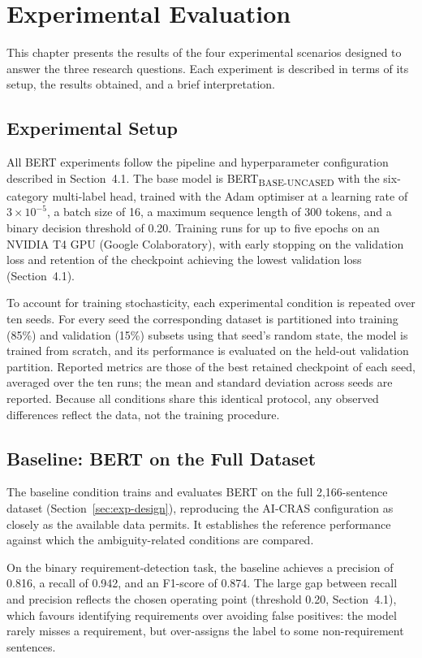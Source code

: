 \chapter{Experimental Evaluation}

This chapter presents the results of the four experimental scenarios designed to answer the three research questions. Each experiment is described in terms of its setup, the results obtained, and a brief interpretation.

\section{Experimental Setup}

All BERT experiments follow the pipeline and hyperparameter configuration described in Section~4.1. The base model is BERT\textsubscript{BASE-UNCASED} with the six-category multi-label head, trained with the Adam optimiser at a learning rate of $3\times10^{-5}$, a batch size of 16, a maximum sequence length of 300 tokens, and a binary decision threshold of 0.20. Training runs for up to five epochs on an NVIDIA T4 GPU (Google Colaboratory), with early stopping on the validation loss and retention of the checkpoint achieving the lowest validation loss (Section~4.1).

To account for training stochasticity, each experimental condition is repeated over ten seeds. For every seed the corresponding dataset is partitioned into training (85\%) and validation (15\%) subsets using that seed's random state, the model is trained from scratch, and its performance is evaluated on the held-out validation partition. Reported metrics are those of the best retained checkpoint of each seed, averaged over the ten runs; the mean and standard deviation across seeds are reported. Because all conditions share this identical protocol, any observed differences reflect the data, not the training procedure.

\section{Baseline: BERT on the Full Dataset}

The baseline condition trains and evaluates BERT on the full 2,166-sentence dataset (Section~\ref{sec:exp-design}), reproducing the AI-CRAS configuration as closely as the available data permits. It establishes the reference performance against which the ambiguity-related conditions are compared.

On the binary requirement-detection task, the baseline achieves a precision of 0.816, a recall of 0.942, and an F1-score of 0.874. The large gap between recall and precision reflects the chosen operating point (threshold 0.20, Section~4.1), which favours identifying requirements over avoiding false positives: the model rarely misses a requirement, but over-assigns the label to some non-requirement sentences.

